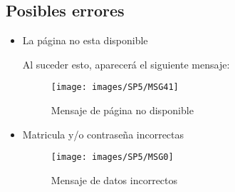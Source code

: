         \subsection{Posibles errores}
        
            \begin{itemize}
                \item La página no esta disponible
                
                    Al suceder esto, aparecerá el siguiente mensaje:
                    \begin{figure}[!hbtp]
                        \centering
                        \hypertarget{MSG41}{\texttt{[image: images/SP5/MSG41]}}
                        \caption{Mensaje de página no disponible}
                    \end{figure}
                    
                \item Matricula y/o contraseña incorrectas
                    \begin{figure}[!hbtp]
                        \centering
                        \hypertarget{MSG0}{\texttt{[image: images/SP5/MSG0]}}
                        \caption{Mensaje de datos incorrectos}
                    \end{figure}
                    
            \end{itemize}